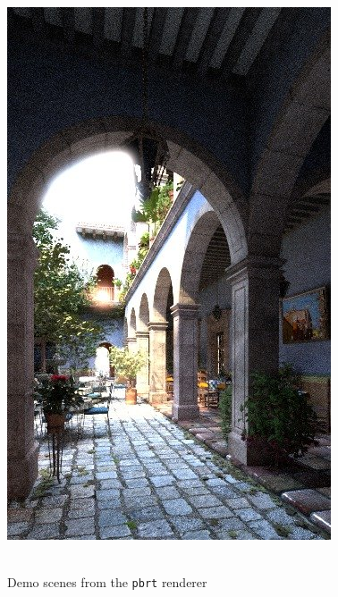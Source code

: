 \documentclass[utf8,stillsansserifmath,fleqn,t]{beamer}
\newcommand{\code}[1]{\texttt{#1}}
\begin{document}
\begin{frame}
\begin{minipage}{.28\textwidth}
\includegraphics[width=\textwidth]{./fig/pbrt-sanmiguel.jpg}
\end{minipage}\\\vfill
Demo scenes from the \code{pbrt} renderer
\end{frame}
\end{document}
